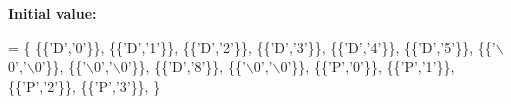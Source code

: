 {\bfseries Initial value\+:}
\begin{DoxyCode}
=
\{
   \{\{\textcolor{charliteral}{'D'},\textcolor{charliteral}{'0'}\}\},
   \{\{\textcolor{charliteral}{'D'},\textcolor{charliteral}{'1'}\}\},
   \{\{\textcolor{charliteral}{'D'},\textcolor{charliteral}{'2'}\}\},
   \{\{\textcolor{charliteral}{'D'},\textcolor{charliteral}{'3'}\}\},
   \{\{\textcolor{charliteral}{'D'},\textcolor{charliteral}{'4'}\}\},
   \{\{\textcolor{charliteral}{'D'},\textcolor{charliteral}{'5'}\}\},
   \{\{\textcolor{charliteral}{'\(\backslash\)0'},\textcolor{charliteral}{'\(\backslash\)0'}\}\},
   \{\{\textcolor{charliteral}{'\(\backslash\)0'},\textcolor{charliteral}{'\(\backslash\)0'}\}\},
   \{\{\textcolor{charliteral}{'D'},\textcolor{charliteral}{'8'}\}\},
   \{\{\textcolor{charliteral}{'\(\backslash\)0'},\textcolor{charliteral}{'\(\backslash\)0'}\}\},
   \{\{\textcolor{charliteral}{'P'},\textcolor{charliteral}{'0'}\}\},
   \{\{\textcolor{charliteral}{'P'},\textcolor{charliteral}{'1'}\}\},
   \{\{\textcolor{charliteral}{'P'},\textcolor{charliteral}{'2'}\}\},
   \{\{\textcolor{charliteral}{'P'},\textcolor{charliteral}{'3'}\}\},
\}
\end{DoxyCode}
